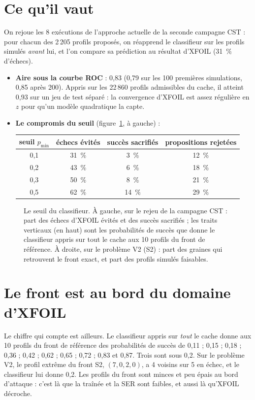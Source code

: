 \section{Ce qu'il vaut}
On rejoue les 8 exécutions de l'approche actuelle de la seconde campagne CST : pour chacun des 2\,205 profils proposés, on réapprend le classifieur sur les profils simulés \emph{avant} lui, et l'on compare sa prédiction au résultat d'XFOIL (31~\% d'échecs).
\begin{itemize}
\item \textbf{Aire sous la courbe ROC} : 0,83 (0,79 sur les 100 premières simulations, 0,85 après 200). Appris sur les 22\,860 profils admissibles du cache, il atteint 0,93 sur un jeu de test séparé : la convergence d'XFOIL est assez régulière en $z$ pour qu'un modèle quadratique la capte.
\item \textbf{Le compromis du seuil} (figure~\ref{fig:seuils}, à gauche) :
\begin{center}
\begin{tabular}{cccc}
\toprule
seuil $p_{\min}$ & échecs évités & succès sacrifiés & propositions rejetées \\
\midrule
0,1 & 31~\% & 3~\% & 12~\% \\
0,2 & 43~\% & 6~\% & 18~\% \\
0,3 & 50~\% & 8~\% & 21~\% \\
0,5 & 62~\% & 14~\% & 29~\% \\
\bottomrule
\end{tabular}
\end{center}
\end{itemize}

\begin{figure}[htbp]
\centering

\caption{Le seuil du classifieur. À gauche, sur le rejeu de la campagne CST : part des échecs d'XFOIL évités et des succès sacrifiés ; les traits verticaux (en haut) sont les probabilités de succès que donne le classifieur appris sur tout le cache aux 10 profils du front de référence. À droite, sur le problème V2 (S2) : part des graines qui retrouvent le front exact, et part des profils simulés faisables.}\label{fig:seuils}
\end{figure}

\section{Le front est au bord du domaine d'XFOIL}
Le chiffre qui compte est ailleurs. Le classifieur appris sur \emph{tout} le cache donne aux 10 profils du front de référence des probabilités de succès de 0,11 ; 0,15 ; 0,18 ; 0,36 ; 0,42 ; 0,62 ; 0,65 ; 0,72 ; 0,83 et 0,87. Trois sont sous 0,2. Sur le problème V2, le profil extrême du front S2, $(7,0,2,0)$, a 4 voisins sur 5 en échec, et le classifieur lui donne 0,2. Les profils du front sont minces et peu épais au bord d'attaque : c'est là que la traînée et la SER sont faibles, et aussi là qu'XFOIL décroche.

